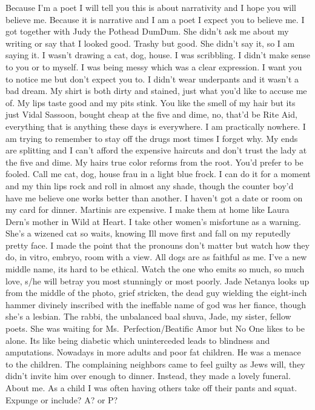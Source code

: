 \documentclass[
]{memoir}
\begin{document}
Because I'm a poet I will tell you this is about narrativity and I hope
you will believe me. Because it is narrative and I am a poet I expect
you to believe me. I got together with Judy the Pothead DumDum. She
didn't ask me about my writing or say that I looked good. Trashy but
good. She didn't say it, so I am saying it. I wasn't drawing a cat, dog,
house. I was scribbling. I didn't make sense to you or to myself. I was
being messy which was a clear expression. I want you to notice me but
don't expect you to. I didn't wear underpants and it wasn't a bad dream.
My shirt is both dirty and stained, just what you'd like to accuse me
of. My lips taste good and my pits stink. You like the smell of my hair
but its just Vidal Sassoon, bought cheap at the five and dime, no,
that'd be Rite Aid, everything that is anything these days is
everywhere. I am practically nowhere. I am trying to remember to stay
off the drugs most times I forget why. My ends are splitting and I can't
afford the expensive haircuts and don't trust the lady at the five and
dime. My hairs true color reforms from the root. You'd prefer to be
fooled. Call me cat, dog, house frau in a light blue frock. I can do it
for a moment and my thin lips rock and roll in almost any shade, though
the counter boy'd have me believe one works better than another. I
haven't got a date or room on my card for dinner. Martinis are
expensive. I make them at home like Laura Dern's mother in Wild at
Heart. I take other women's misfortune as a warning. She's a wizened cat
so waits, knowing Ill move first and fall on my reputedly pretty face. I
made the point that the pronouns don't matter but watch how they do, in
vitro, embryo, room with a view. All dogs are as faithful as me. I've a
new middle name, its hard to be ethical. Watch the one who emits so
much, so much love, s/he will betray you most stunningly or most poorly.
Jade Netanya looks up from the middle of the photo, grief stricken, the
dead guy wielding the eight-inch hammer divinely inscribed with the
ineffable name of god was her fiance, though she's a lesbian. The rabbi,
the unbalanced baal shuva, Jade, my sister, fellow poets. She was
waiting for Ms.~Perfection/Beatific Amor but No One likes to be alone.
Its like being diabetic which uninterceded leads to blindness and
amputations. Nowadays in more adults and poor fat children. He was a
menace to the children. The complaining neighbors came to feel guilty as
Jews will, they didn't invite him over enough to dinner. Instead, they
made a lovely funeral. About me. As a child I was often having others
take off their pants and squat. Expunge or include? A? or P?
\end{document}
